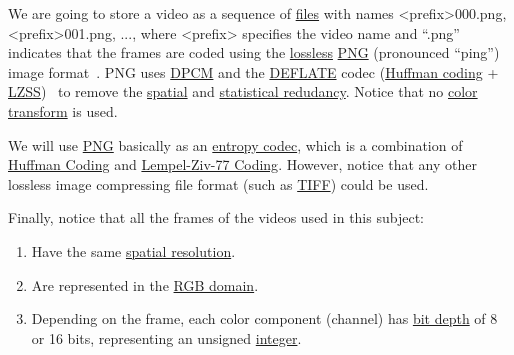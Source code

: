 We are going to store a video as a sequence of
\href{https://en.wikipedia.org/wiki/Computer_file}{files} with names
<prefix>000.png, <prefix>001.png, ..., where <prefix> specifies the
video name and ``.png'' indicates that the frames are coded using the
\href{https://en.wikipedia.org/wiki/Lossless_compression}{lossless}
\href{https://en.wikipedia.org/wiki/Portable_Network_Graphics}{PNG}
(pronounced ``ping'') image
format~\cite{roelofs1999png,world2003portable}. PNG uses
\href{https://en.wikipedia.org/wiki/Differential_pulse-code_modulation}{DPCM}
and the \href{https://en.wikipedia.org/wiki/DEFLATE}{DEFLATE} codec
(\href{https://en.wikipedia.org/wiki/Huffman_coding}{Huffman coding} +
\href{https://en.wikipedia.org/wiki/Lempel-Ziv-Storer-Szymanski}{LZSS})~\cite{nelson96datacompression}
to remove the
\href{https://en.wikipedia.org/wiki/Image_compression}{spatial} and
\href{https://en.wikipedia.org/wiki/Data_compression}{statistical
  redudancy}. Notice that no
\href{https://en.wikipedia.org/wiki/YUV}{color transform} is used.

We will use \href{https://vicente-gonzalez-ruiz.github.io/PNG/}{PNG}
basically as an
\href{https://en.wikipedia.org/wiki/Entropy_encoding}{entropy codec},
which is a combination of
\href{https://vicente-gonzalez-ruiz.github.io/Huffman_coding/}{Huffman
  Coding} and
\href{https://vicente-gonzalez-ruiz.github.io/LZ77/}{Lempel-Ziv-77
  Coding}. However, notice that any other lossless image compressing
file format (such as \href{https://en.wikipedia.org/wiki/TIFF}{TIFF})
could be used.

Finally, notice that all the frames of the videos used in this
subject:
\begin{enumerate}
\item Have the same
  \href{https://en.wikipedia.org/wiki/Image_resolution}{spatial
    resolution}.
\item Are represented in the
  \href{https://en.wikipedia.org/wiki/RGB_color_model}{RGB domain}.
\item Depending on the frame, each color component (channel) has
  \href{https://en.wikipedia.org/wiki/Glossary_of_computer_graphics#bit_depth}{bit
    depth} of 8 or 16 bits, representing an unsigned
  \href{https://en.wikipedia.org/wiki/Integer_(computer_science)}{integer}.
\end{enumerate}
  
